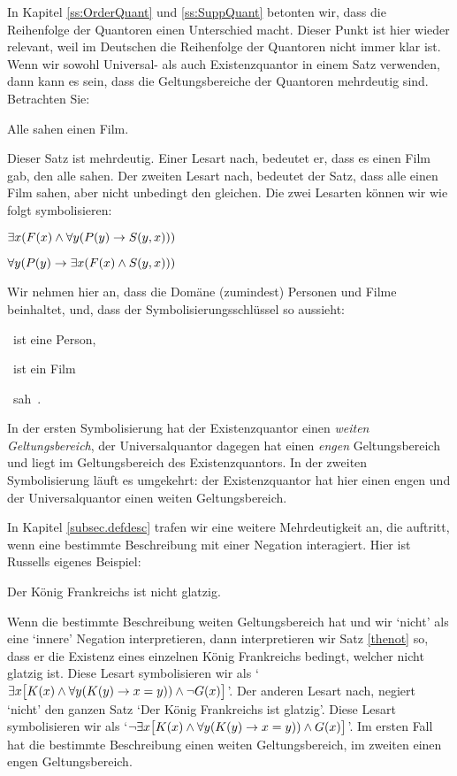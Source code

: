 In Kapitel \ref{ss:OrderQuant} und \ref{ss:SuppQuant} betonten wir, dass die Reihenfolge der Quantoren einen Unterschied macht. Dieser Punkt ist hier wieder relevant, weil im Deutschen die Reihenfolge der Quantoren nicht immer klar ist. Wenn wir sowohl Universal- als auch Existenzquantor in einem Satz verwenden, dann kann es sein, dass die Geltungsbereiche der Quantoren mehrdeutig sind. Betrachten Sie:
\begin{earg}
	\item[\ex{everya}] Alle sahen einen Film.
\end{earg}
Dieser Satz ist mehrdeutig. Einer Lesart nach, bedeutet er, dass es einen Film gab, den alle sahen. Der zweiten Lesart nach, bedeutet der Satz, dass alle einen Film sahen, aber nicht unbedingt den gleichen. Die zwei Lesarten können wir wie folgt symbolisieren: 
\begin{earg}
	\item[] $\exists x(\mathord{F}(x) \wedge \forall y(\mathord{P}(y) \rightarrow \mathord{S}(y,x)))$ %
	\item[] $\forall y(\mathord{P}(y) \rightarrow \exists x(\mathord{F}(x) \wedge \mathord{S}(y,x)))$
\end{earg}
Wir nehmen hier an, dass die Domäne (zumindest) Personen und Filme beinhaltet, und, dass der Symbolisierungsschlüssel so aussieht:
\begin{ekey}
	\item[\atom{P}{y}] ~ist eine Person, 
	\item[\atom{F}{x}] ~ist ein Film
	\item[\atom{S}{y,x}] ~sah~. 
\end{ekey}
In der ersten Symbolisierung hat der Existenzquantor einen \emph{weiten Geltungsbereich}, der Universalquantor dagegen hat einen \emph{engen} Geltungsbereich und liegt im Geltungsbereich des Existenzquantors. In der zweiten Symbolisierung läuft es umgekehrt: der Existenzquantor hat hier einen engen und der Universalquantor einen weiten Geltungsbereich.

In Kapitel \ref{subsec.defdesc} trafen wir eine weitere Mehrdeutigkeit an, die auftritt, wenn eine bestimmte Beschreibung mit einer Negation interagiert.  Hier ist Russells eigenes Beispiel:
\begin{earg}
	\item[\ex{thenot}] Der König Frankreichs ist nicht glatzig.
\end{earg}
Wenn die bestimmte Beschreibung weiten Geltungsbereich hat und wir `nicht' als eine `innere' Negation interpretieren, dann interpretieren wir Satz \ref{thenot} so, dass er die Existenz eines einzelnen König Frankreichs bedingt, welcher nicht glatzig ist. Diese Lesart symbolisieren wir als `$\exists x\bigl[\mathord{K}(x) \wedge \forall y(\mathord{K}(y) \rightarrow x=y)) \wedge \neg \mathord{G}(x)\bigr]$'. Der anderen Lesart nach, negiert `nicht' den ganzen Satz `Der König Frankreichs ist glatzig'. Diese Lesart symbolisieren wir als `$\neg\exists x\bigl[\mathord{K}(x) \wedge \forall y(\mathord{K}(y) \rightarrow x=y)) \wedge \mathord{G}(x)\bigr]$'. Im ersten Fall hat die bestimmte Beschreibung einen weiten Geltungsbereich, im zweiten einen engen Geltungsbereich.

